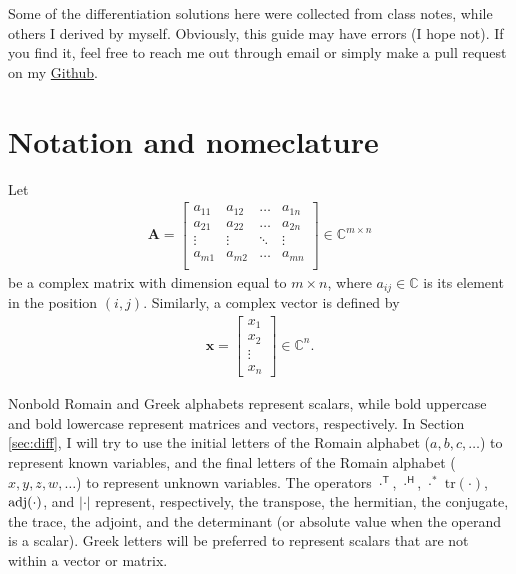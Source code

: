 \documentclass{article}
\newcommand{\trans}{\mathsf{T}}
\newcommand{\hermit}{\mathsf{H}}
\newcommand\abs[1]{\left\lvert#1\right\rvert}
\begin{document}
Some of the differentiation solutions here were collected from class notes, while others I derived by myself. Obviously, this guide may have errors (I hope not). If you find it, feel free to reach me out through email or simply make a pull request on my \href{https://github.com/tapyu/courses/tree/main/matrix_diff_ref}{Github}.

\section{Notation and nomeclature}

Let
\begin{align}
    \mathbf{A} = \begin{bmatrix}
        a_{11} & a_{12} & \dots & a_{1n} \\
        a_{21} & a_{22} & \dots & a_{2n} \\
        \vdots & \vdots & \ddots & \vdots \\
        a_{m1} & a_{m2} & \dots & a_{mn} \\
    \end{bmatrix} \in \mathbb{C}^{m \times n}
\end{align}
be a complex matrix with dimension equal to \(m \times n\), where \(a_{ij} \in \mathbb{C}\) is its element in the position \((i,j)\). Similarly, a complex vector is defined by
\begin{align}
    \mathbf{x} = \begin{bmatrix}
        x_1 \\
        x_2 \\
        \vdots \\
        x_n
    \end{bmatrix}  \in \mathbb{C}^{n}.
\end{align}

Nonbold Romain and Greek alphabets represent scalars, while bold uppercase and bold lowercase represent matrices and vectors, respectively. In Section \ref{sec:diff}, I will try to use the initial letters of the Romain alphabet (\(a, b, c, \dots\)) to represent known variables, and the final letters of the Romain alphabet (\(x, y, z, w, \dots\)) to represent unknown variables. The operators \(\cdot^{\trans}\), \(\cdot^{\hermit}\), \(\cdot^*\) \(\text{tr}(\cdot)\), \(\textnormal{adj}(\cdot)\), and \(\abs{\cdot}\) represent, respectively, the transpose, the hermitian, the conjugate, the trace, the adjoint, and the determinant (or absolute value when the operand is a scalar). Greek letters will be preferred to represent scalars that are not within a vector or matrix.
\end{document}
